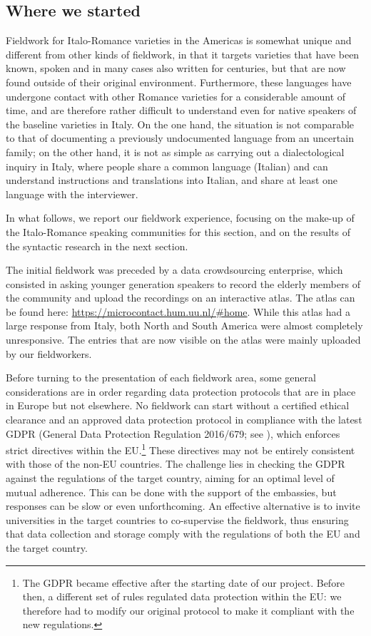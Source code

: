 \documentclass[output=paper,hidelinks]{langscibook}
\begin{document}
\subsection{Where we started}\label{sec:andriani:2.1}

Fieldwork for Italo-Romance varieties in the Americas is somewhat unique and different from other kinds of fieldwork, in that it targets varieties that have been known, spoken and in many cases also written for centuries, but that are now found outside of their original environment. Furthermore, these languages have undergone contact with other Romance varieties for a considerable amount of time, and are therefore rather difficult to understand even for native speakers of the baseline varieties in Italy. On the one hand, the situation is not comparable to that of documenting a previously undocumented language from an uncertain family; on the other hand, it is not as simple as carrying out a dialectological inquiry in Italy, where people share a common language (Italian) and can understand instructions and translations into Italian, and share at least one language with the interviewer.

In what follows, we report our fieldwork experience, focusing on the make-up of the Italo-Romance speaking communities for this section, and on the results of the syntactic research in the next section.

The initial fieldwork was preceded by a data crowdsourcing enterprise, which consisted in asking younger generation speakers to record the elderly members of the community and upload the recordings on an interactive atlas. The atlas can be found here: \url{https://microcontact.hum.uu.nl/\#home}. While this atlas had a large response from Italy, both North and South America were almost completely unresponsive. The entries that are now visible on the atlas were mainly uploaded by our fieldworkers.

Before turning to the presentation of each fieldwork area, some general considerations are in order regarding data protection protocols that are in place in Europe but not elsewhere. No fieldwork can start without a certified ethical clearance and an approved data protection protocol in compliance with the latest GDPR (General Data Protection Regulation 2016/679; see \citealt{LeivadaDAlessandroGrohmann2019}), which enforces strict directives within the EU.\footnote{The GDPR became effective after the starting date of our project. Before then, a different set of rules regulated data protection within the EU: we therefore had to modify our original protocol to make it compliant with the new regulations.} These directives may not be entirely consistent with those of the non-EU countries. The challenge lies in checking the GDPR against the regulations of the target country, aiming for an optimal level of mutual adherence. This can be done with the support of the embassies, but responses can be slow or even unforthcoming. An effective alternative is to invite universities in the target countries to co-supervise the fieldwork, thus ensuring that data collection and storage comply with the regulations of both the EU and the target country.
\end{document}
